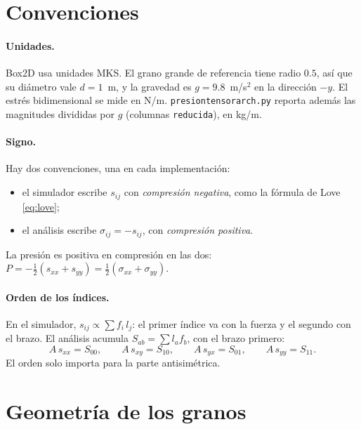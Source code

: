 \documentclass[11pt,a4paper]{article}
\newcommand{\codeus}{\textunderscore\allowbreak}
\newcommand{\code}[1]{\texttt{\begingroup\let\_\codeus#1\endgroup}}
\begin{document}
\section{Convenciones}
\label{sec:conv}

\paragraph{Unidades.} Box2D usa unidades MKS. El grano grande de
referencia tiene radio $0.5$, así que su diámetro vale $d = 1$~m, y la
gravedad es $g = 9.8$~m/s$^2$ en la dirección $-y$. El estrés
bidimensional se mide en N/m. \code{presion\_tensor\_arch.py} reporta
además las magnitudes divididas por $g$ (columnas \code{\_reducida}), en
kg/m.

\paragraph{Signo.} Hay dos convenciones, una en cada implementación:
\begin{itemize}
  \item el simulador escribe $s_{ij}$ con \emph{compresión negativa}, como
    la fórmula de Love \eqref{eq:love};
  \item el análisis escribe $\sigma_{ij} = -s_{ij}$, con \emph{compresión
    positiva}.
\end{itemize}
La presión es positiva en compresión en las dos:
$P = -\tfrac12(s_{xx}+s_{yy}) = \tfrac12(\sigma_{xx}+\sigma_{yy})$.

\paragraph{Orden de los índices.} En el simulador,
$s_{ij} \propto \sum f_i\, l_j$: el primer índice va con la fuerza y el
segundo con el brazo. El análisis acumula
$S_{ab} = \sum l_a f_b$, con el brazo primero:
\begin{equation}
  A\, s_{xx} = S_{00}, \qquad A\, s_{xy} = S_{10}, \qquad
  A\, s_{yx} = S_{01}, \qquad A\, s_{yy} = S_{11}.
  \label{eq:mapeo}
\end{equation}
El orden solo importa para la parte antisimétrica.

\section{Geometría de los granos}
\label{sec:geom}
\end{document}
